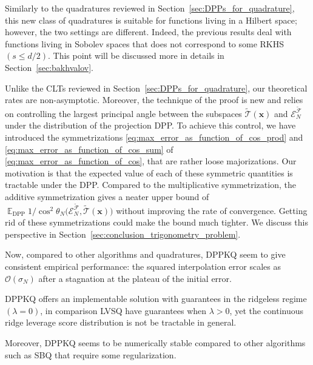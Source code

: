 \documentclass[twoside,11pt]{book}
\numberwithin{theorem}{chapter}
\numberwithin{definition}{chapter}
\numberwithin{proposition}{chapter}
\numberwithin{corollary}{chapter}
\numberwithin{example}{chapter}
\numberwithin{lemma}{chapter}
\numberwithin{assumption}{chapter}
\numberwithin{equation}{chapter}
\numberwithin{figure}{chapter}
\DeclareMathOperator{\DPP}{\mathrm{DPP}}
\DeclareMathOperator{\EX}{\mathbb{E}}
\DeclareMathOperator{\F}{\mathcal{F}}
\begin{document}
Similarly to the quadratures reviewed in Section~\ref{sec:DPPs_for_quadrature}, this new class of quadratures is suitable for functions living in a Hilbert space; however, the two settings are different. Indeed, the previous results deal with functions living in Sobolev spaces that does not correspond to some RKHS $(s \leq d/2)$. This point will be discussed more in details in Section~\ref{sec:bakhvalov}. 

Unlike the CLTs reviewed in Section~\ref{sec:DPPs_for_quadrature}, our theoretical rates are non-asymptotic. Moreover, the technique of the proof is new and relies on controlling the  largest principal angle between the subspaces $\tilde{\mathcal{T}}(\bm{x})$ and $\mathcal{E}_{N}^{\tilde{\F}}$ under the distribution of the projection DPP. To achieve this control, we have introduced the symmetrizations \eqref{eq:max_error_as_function_of_cos_prod} and \eqref{eq:max_error_as_function_of_cos_sum}  of \eqref{eq:max_error_as_function_of_cos}, that are rather loose majorizations. Our motivation is that the expected value of each of these symmetric quantities is tractable under the DPP. 
Compared to the multiplicative symmetrization, the additive symmetrization gives a neater upper bound of $\EX_{\DPP}  1 \big/\cos^{2} \theta_{N} \big(\mathcal{E}^{\tilde{\mathcal{F}}}_{N}, \tilde{\mathcal{T}}(\bm{x}) \big)$ without improving the rate of convergence. Getting rid of these symmetrizations could make the bound much tighter. We discuss this perspective in Section~\ref{sec:conclusion_trigonometry_problem}.


Now, compared to other algorithms and quadratures, DPPKQ seem to give consistent empirical performance: the squared interpolation error scales as $\mathcal{O}(\sigma_{N})$ after a stagnation at the plateau of the initial error. 

 DPPKQ offers an implementable solution with guarantees in the ridgeless regime $(\lambda = 0)$, in comparison LVSQ have guarantees when $\lambda >0$, yet the continuous ridge leverage score distribution is not be tractable in general. 


Moreover, DPPKQ seems to be numerically stable compared to other algorithms such as SBQ that require some regularization.  


\end{document}
